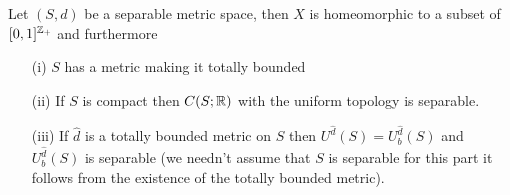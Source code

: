 \begin{lem}\label{SeparabilityOfBoundedUniformlyContinuous}Let $(S,d)$ be a separable metric space, then $X$ is
  homeomorphic to a subset of $[0,1]^{\mathbb{Z}_+}$ and furthermore
\begin{itemize}
\item[(i)]$S$ has a metric making it totally bounded
\item[(ii)]If $S$ is compact then $C(S; \mathbb{R})$ with the uniform
  topology is separable.
\item[(iii)]If $\hat{d}$ is a totally bounded metric on $S$ then $U^{\hat{d}}(S) = U^{\hat{d}}_b(S)$ and 
  $U^{\hat{d}}_b(S)$ is separable (we needn't assume that $S$ is separable for this part it follows from the existence of the totally bounded metric).
\end{itemize}
\end{lem}
